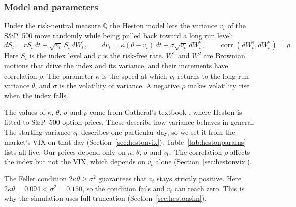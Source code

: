 
\subsubsection{Model and parameters}

Under the risk-neutral measure $\mathbb{Q}$ the Heston model lets the variance $v_t$ of the S\&P~500 move randomly while being pulled back toward a long run level:
\begin{equation}
  dS_t = rS_t\,dt + \sqrt{v_t}\,S_t\,dW^1_t, \qquad
  dv_t = \kappa(\theta - v_t)\,dt + \sigma\sqrt{v_t}\,dW^2_t, \qquad
  \operatorname{corr}(dW^1_t, dW^2_t) = \rho .
  \label{eq:heston}
\end{equation}
Here $S_t$ is the index level and $r$ is the risk-free rate. $W^1$ and $W^2$ are Brownian motions that drive the index and its variance, and their increments have correlation $\rho$. The parameter $\kappa$ is the speed at which $v_t$ returns to the long run variance $\theta$, and $\sigma$ is the volatility of variance. A negative $\rho$ makes volatility rise when the index falls.

The values of $\kappa$, $\theta$, $\sigma$ and $\rho$ come from Gatheral's textbook \cite{gatheral}, where Heston is fitted to S\&P~500 option prices. These describe how variance behaves in general. The starting variance $v_0$ describes one particular day, so we set it from the market's VIX on that day (Section~\ref{sec:hestonvix}). Table~\ref{tab:hestonparams} lists all five. Our prices depend only on $\kappa$, $\theta$, $\sigma$ and $v_0$. The correlation $\rho$ affects the index but not the VIX, which depends on $v_t$ alone (Section~\ref{sec:hestonvix}).

The Feller condition $2\kappa\theta \ge \sigma^2$ guarantees that $v_t$ stays strictly positive. Here $2\kappa\theta = 0.094 < \sigma^2 = 0.150$, so the condition fails and $v_t$ can reach zero. This is why the simulation uses full truncation (Section~\ref{sec:hestonsim}).

